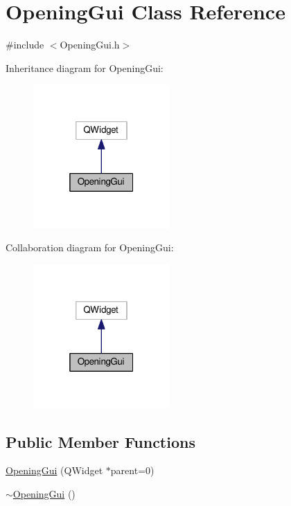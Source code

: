 \hypertarget{class_opening_gui}{\section{Opening\-Gui Class Reference}
\label{class_opening_gui}
}


{\ttfamily \#include $<$Opening\-Gui.\-h$>$}



Inheritance diagram for Opening\-Gui\-:\nopagebreak
\begin{figure}[H]
\begin{center}
\leavevmode
\includegraphics[width=148pt]{class_opening_gui__inherit__graph}
\end{center}
\end{figure}


Collaboration diagram for Opening\-Gui\-:\nopagebreak
\begin{figure}[H]
\begin{center}
\leavevmode
\includegraphics[width=148pt]{class_opening_gui__coll__graph}
\end{center}
\end{figure}
\subsection*{Public Member Functions}
\begin{DoxyCompactItemize}
\item 
\hyperlink{class_opening_gui_a8a9621b42e164fbd73cf0ccfd64d12c5}{Opening\-Gui} (Q\-Widget $\ast$parent=0)
\item 
\hyperlink{class_opening_gui_ad299c3aa9946713fd0ad67f527f62d51}{$\sim$\-Opening\-Gui} ()
\end{DoxyCompactItemize}
